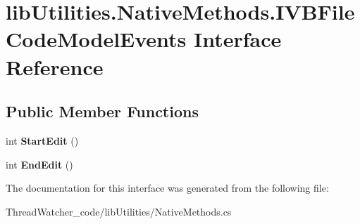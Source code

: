 \hypertarget{interfacelib_utilities_1_1_native_methods_1_1_i_v_b_file_code_model_events}{\section{lib\+Utilities.\+Native\+Methods.\+I\+V\+B\+File\+Code\+Model\+Events Interface Reference}
\label{interfacelib_utilities_1_1_native_methods_1_1_i_v_b_file_code_model_events}
}
\subsection*{Public Member Functions}
\begin{DoxyCompactItemize}
\item 
\hypertarget{interfacelib_utilities_1_1_native_methods_1_1_i_v_b_file_code_model_events_a5a5c9bbd5ba0d43d3ccfc03206ec5ab4}{int {\bfseries Start\+Edit} ()}\label{interfacelib_utilities_1_1_native_methods_1_1_i_v_b_file_code_model_events_a5a5c9bbd5ba0d43d3ccfc03206ec5ab4}

\item 
\hypertarget{interfacelib_utilities_1_1_native_methods_1_1_i_v_b_file_code_model_events_ad4402f0b2e05bc12b23aefec49284227}{int {\bfseries End\+Edit} ()}\label{interfacelib_utilities_1_1_native_methods_1_1_i_v_b_file_code_model_events_ad4402f0b2e05bc12b23aefec49284227}

\end{DoxyCompactItemize}


The documentation for this interface was generated from the following file\+:\begin{DoxyCompactItemize}
\item 
Thread\+Watcher\+\_\+code/lib\+Utilities/Native\+Methods.\+cs\end{DoxyCompactItemize}
